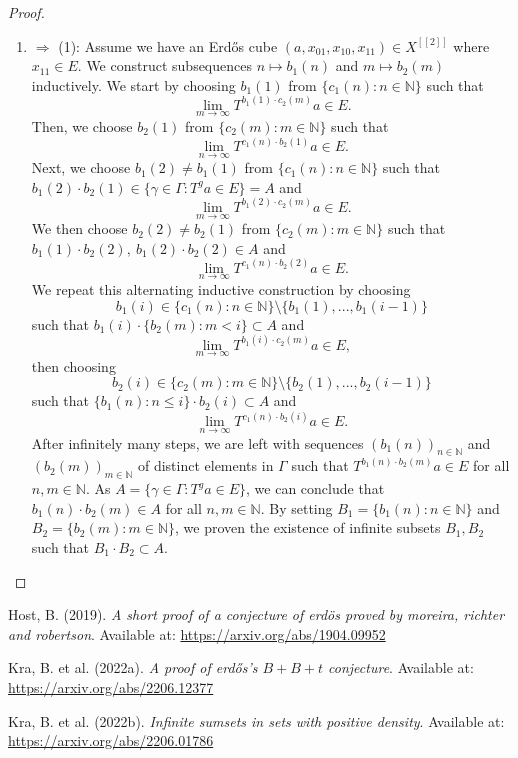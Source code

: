 \documentclass[
  british,
]{article}
\newlength{\cslhangindent}
\newenvironment{CSLReferences}[2] %
 {\begin{list}{}{%
  \setlength{\itemindent}{0pt}
  \setlength{\leftmargin}{0pt}
  \setlength{\parsep}{0pt}
  \ifodd #1
   \setlength{\leftmargin}{\cslhangindent}
   \setlength{\itemindent}{-1\cslhangindent}
  \fi
  \setlength{\itemsep}{#2\baselineskip}}}
 {\end{list}}
\providecommand{\tightlist}{%
  \setlength{\itemsep}{0pt}\setlength{\parskip}{0pt}}
\theoremstyle{plain}
\theoremstyle{definition}
\theoremstyle{remark}
\newcommand{\Group}{{\Gamma}}
\newcommand{\GroupElement}{{\gamma}}
\newcommand{\ShiftSpace}{{X}}
\begin{document}
\begin{proof}
\begin{enumerate}
\def\labelenumi{(\arabic{enumi})}
\setcounter{enumi}{1}
\tightlist
\item
  \(\Rightarrow\) (1): Assume we have an Erdős cube
  \((a,x_{01},x_{10},x_{11})\in\ShiftSpace^{[[2]]}\) where
  \(x_{11}\in E\). We construct subsequences \(n\mapsto b_1(n)\) and
  \(m\mapsto b_2(m)\) inductively. We start by choosing \(b_1(1)\) from
  \(\{c_1(n):n\in\mathbb{N}\}\) such that
  \[\lim_{m\rightarrow\infty}T^{b_1(1)\cdot c_2(m)}a\in E. \] Then, we
  choose \(b_2(1)\) from \(\{c_2(m):m\in\mathbb{N}\}\) such that
  \[\lim_{n\rightarrow\infty}T^{c_1(n)\cdot b_2(1)}a\in E. \] Next, we
  choose \(b_1(2)\neq b_1(1)\) from \(\{c_1(n):n\in\mathbb{N}\}\) such
  that \(b_1(2)\cdot b_2(1)\in\{\GroupElement\in\Group:T^ga\in E\}=A\)
  and \[\lim_{m\rightarrow\infty}T^{b_1(2)\cdot c_2(m)}a\in E. \] We
  then choose \(b_2(2)\neq b_2(1)\) from \(\{c_2(m):m\in\mathbb{N}\}\)
  such that \(b_1(1)\cdot b_2(2),\ b_1(2)\cdot b_2(2)\in A\) and
  \[\lim_{n\rightarrow\infty}T^{c_1(n)\cdot b_2(2)}a\in E. \] We repeat
  this alternating inductive construction by choosing
  \[b_1(i)\in\{c_1(n):n\in\mathbb{N}\}\setminus\{b_1(1),...,b_1(i-1)\}\]
  such that \(b_1(i)\cdot \{b_2(m):m<i\}\subset A\) and
  \[\lim_{m\rightarrow\infty}T^{b_1(i)\cdot c_2(m)}a\in E, \] then
  choosing
  \[b_2(i)\in\{c_2(m):m\in\mathbb{N}\}\setminus\{b_2(1),...,b_2(i-1)\}\]
  such that \(\{b_1(n):n\leq i\}\cdot b_2(i)\subset A\) and
  \[\lim_{n\rightarrow\infty}T^{c_1(n)\cdot b_2(i)}a\in E. \] After
  infinitely many steps, we are left with sequences
  \((b_1(n))_{n\in\mathbb{N}}\) and \((b_2(m))_{m\in\mathbb{N}}\) of
  distinct elements in \(\Group\) such that
  \(T^{b_1(n)\cdot b_2(m)}a\in E\) for all \(n,m\in\mathbb{N}\). As
  \(A=\{\GroupElement\in\Group:T^ga\in E\}\), we can conclude that
  \(b_1(n)\cdot b_2(m)\in A\) for all \(n,m\in\mathbb{N}\). By setting
  \(B_1=\{b_1(n):n\in\mathbb{N}\}\) and
  \(B_2=\{b_2(m):m\in\mathbb{N}\}\), we proven the existence of infinite
  subsets \(B_1,B_2\) such that \(B_1\cdot B_2\subset A\).
\end{enumerate}

\end{proof}

\protect{}\label{refs}
\begin{CSLReferences}{1}{0}
Host, B. (2019). \emph{A short proof of a conjecture of erdös proved by
moreira, richter and robertson}. Available at:
\url{https://arxiv.org/abs/1904.09952}

Kra, B. et al. (2022a). \emph{A proof of erdős's \(B+B+t\) conjecture}.
Available at: \url{https://arxiv.org/abs/2206.12377}

Kra, B. et al. (2022b). \emph{Infinite sumsets in sets with positive
density}. Available at: \url{https://arxiv.org/abs/2206.01786}

\end{CSLReferences}
\end{document}
